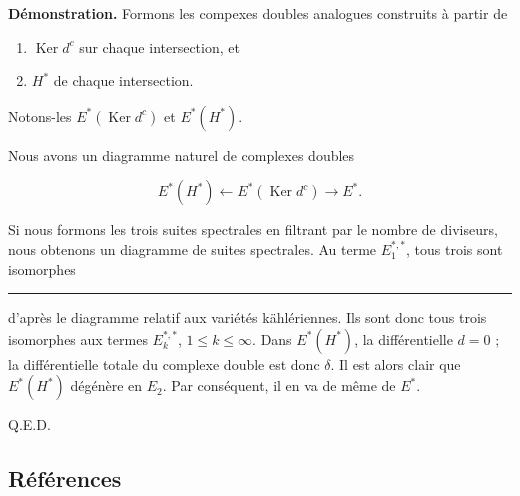 \documentclass[
  french,
  a3paper,
  a3paper]{extarticle}
\begin{document}
\textbf{Démonstration.} Formons les compexes doubles analogues
construits à partir de

\begin{enumerate}
\def\labelenumi{\arabic{enumi})}
\item
  \(\operatorname{Ker}d^c\) sur chaque intersection, et
\item
  \(H^*\) de chaque intersection.
\end{enumerate}

Notons-les \(E^*(\operatorname{Ker}d^c)\) et \(E^*(H^*)\).

Nous avons un diagramme naturel de complexes doubles

\[E^*(H^*)\longleftarrow E^*(\operatorname{Ker}d^c)\longrightarrow E^*.\]

Si nous formons les trois suites spectrales en filtrant par le nombre de
diviseurs, nous obtenons un diagramme de suites spectrales. Au terme
\(E_1^{*,*}\), tous trois sont isomorphes

\clearpage



\par

\vspace{0.7mm}\hrule\vspace{1.6mm}

\fontsize{9}{11}\selectfont

d'après le diagramme relatif aux variétés kählériennes. Ils sont donc
tous trois isomorphes aux termes \(E_k^{*,*}\), \(1\leq k\leq\infty\).
Dans \(E^*(H^*)\), la différentielle \(d=0\) ; la différentielle totale
du complexe double est donc \(\delta\). Il est alors clair que
\(E^*(H^*)\) dégénère en \(E_2\). Par conséquent, il en va de même de
\(E^*\).

Q.E.D.

\subsection{Références}\label{ruxe9fuxe9rences}
\end{document}
